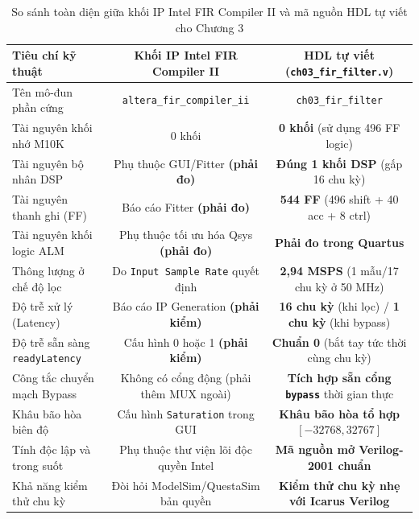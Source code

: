 \begin{table}[htbp]
\centering
\footnotesize
\setlength{\tabcolsep}{3.5pt}
\caption{So sánh toàn diện giữa khối IP Intel FIR Compiler II và mã nguồn HDL tự viết cho Chương 3}
\label{tab:ch03_ip_vs_hdl}
\begin{tabular}{lcc}
\toprule
Tiêu chí kỹ thuật & Khối IP Intel FIR Compiler II & HDL tự viết (\texttt{ch03\_fir\_filter.v}) \\
\midrule
Tên mô-đun phần cứng & \texttt{altera\_fir\_compiler\_ii} & \texttt{ch03\_fir\_filter} \\
Tài nguyên khối nhớ M10K & 0 khối & \textbf{0 khối} (sử dụng 496 FF logic) \\
Tài nguyên bộ nhân DSP & Phụ thuộc GUI/Fitter \textbf{(phải đo)} & \textbf{Đúng 1 khối DSP} (gấp 16 chu kỳ) \\
Tài nguyên thanh ghi (FF) & Báo cáo Fitter \textbf{(phải đo)} & \textbf{544 FF} (496 shift + 40 acc + 8 ctrl) \\
Tài nguyên khối logic ALM & Phụ thuộc tối ưu hóa Qsys \textbf{(phải đo)} & \textbf{Phải đo trong Quartus} \\
Thông lượng ở chế độ lọc & Do \texttt{Input Sample Rate} quyết định & \textbf{2{,}94 MSPS} (1 mẫu/17 chu kỳ ở 50 MHz) \\
Độ trễ xử lý (Latency) & Báo cáo IP Generation \textbf{(phải kiểm)} & \textbf{16 chu kỳ} (khi lọc) / \textbf{1 chu kỳ} (khi bypass) \\
Độ trễ sẵn sàng \texttt{readyLatency} & Cấu hình 0 hoặc 1 \textbf{(phải kiểm)} & \textbf{Chuẩn 0} (bắt tay tức thời cùng chu kỳ) \\
Công tắc chuyển mạch Bypass & Không có cổng động (phải thêm MUX ngoài) & \textbf{Tích hợp sẵn cổng \texttt{bypass}} thời gian thực \\
Khâu bão hòa biên độ & Cấu hình \texttt{Saturation} trong GUI & \textbf{Khâu bão hòa tổ hợp} $[-32768, 32767]$ \\
Tính độc lập và trong suốt & Phụ thuộc thư viện lõi độc quyền Intel & \textbf{Mã nguồn mở Verilog-2001 chuẩn} \\
Khả năng kiểm thử chu kỳ & Đòi hỏi ModelSim/QuestaSim bản quyền & \textbf{Kiểm thử chu kỳ nhẹ với Icarus Verilog} \\
\bottomrule
\end{tabular}
\end{table}

